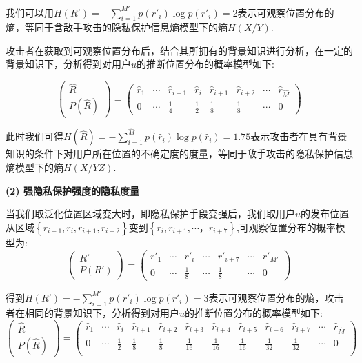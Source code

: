我们可以用$H({R}')=-\sum_{i=1}^{{M}'}p({r}'_{i})\log p({r}'_{i})=2$表示可观察位置分布的熵，等同于含敌手攻击的隐私保护信息熵模型下的熵$H(X/Y)$.

攻击者在获取到可观察位置分布后，结合其所拥有的背景知识进行分析，在一定的背景知识下，分析得到对用户$u$的推断位置分布的概率模型如下:

\begin{equation*}
\begin{pmatrix}
\hat{R}\\ 
P(\hat{R})
\end{pmatrix}=\begin{pmatrix}
\hat{r}_{1} & \cdots  & \hat{r}_{i-1} & \hat{r}_{i} & \hat{r}_{i+1}  & \hat{r}_{i+2} & \cdots & \hat{r}_{\hat{M}} \\ 
0 & \cdots & \frac{1}{4} & \frac{1}{2} & \frac{1}{8}  & \frac{1}{8} & \cdots & 0
\end{pmatrix}
\end{equation*}

此时我们可得$H(\hat{R})=-\sum_{i=1}^{\hat{M}}p(\hat{r}_{i})\log p(\hat{r}_{i})=1.75
$表示攻击者在具有背景知识的条件下对用户所在位置的不确定度的度量，等同于敌手攻击的隐私保护信息熵模型下的熵$H(X/YZ)$.

\textbf{(2) 强隐私保护强度的隐私度量}

当我们取泛化位置区域变大时，即隐私保护手段变强后，我们取用户$u$的发布位置从区域$\left \{ r_{i-1},r_{i},r_{i+1},r_{i+2} \right \}$变到$\left \{ r_{i},r_{i+1},\cdots，r_{i+7} \right \}$,可观察位置分布的概率模型为:
\begin{equation*}
\begin{pmatrix}
{R}'\\ 
P({R}')
\end{pmatrix}=\begin{pmatrix}
{r}'_{1} & \cdots & {r}'_{i}  & \cdots & {r}'_{i+7} & \cdots & {r}'_{{M}'}\\ 
0 & \cdots  & \frac{1}{8} & \cdots  & \frac{1}{8} & \cdots  & 0
\end{pmatrix}
\end{equation*}

得到$H({R}')=-\sum_{i=1}^{{M}'}p({r}'_{i})\log p({r}'_{i})=3$表示可观察位置分布的熵，攻击者在相同的背景知识下，分析得到对用户$u$的推断位置分布的概率模型如下:
\begin{equation*}
\begin{pmatrix}
\hat{R}\\ 
P(\hat{R})
\end{pmatrix}=\left( \begin{array}{cccccccccccc} 
\hat{r}_{1} & \cdots  & \hat{r}_{i} & \hat{r}_{i+1} & \hat{r}_{i+2} & \hat{r}_{i+3} & \hat{r}_{i+4} & \hat{r}_{i+5} & \hat{r}_{i+6} & \hat{r}_{i+7} & \cdots  & \hat{r}_{\hat{M}} \\
0 & \cdots  & \frac{1}{2} & \frac{1}{8} & \frac{1}{8} & \frac{1}{16} & \frac{1}{16} & \frac{1}{16} & \frac{1}{32} & \frac{1}{32} & \cdots  & 0\\
\end{array} \right)
\end{equation*}

